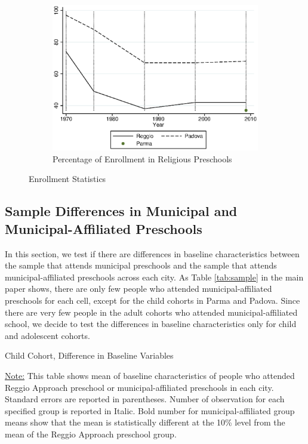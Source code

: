 \begin{figure}[H]
\begin{subfigure}[ht]{0.48\textwidth}
        \includegraphics[width=\textwidth]{../../output/image/enroll_per_priv_graph.eps}
        \caption{Percentage of Enrollment in Religious Preschools}
        \label{fig:large}
      \end{subfigure}
      \caption{Enrollment Statistics}  \label{fig:enrollment}
    \end{figure}    
    
    
\subsection{Sample Differences in Municipal and Municipal-Affiliated Preschools}

In this section, we test if there are differences in baseline characteristics between the sample that attends municipal preschools and the sample that attends municipal-affiliated preschools across each city. As Table \ref{tab:sample} in the main paper shows, there are only few people who attended municipal-affiliated preschools for each cell, except for the child cohorts in Parma and Padova. Since there are very few people in the adult cohorts who attended municipal-affiliated school, we decide to test the differences in baseline characteristics only for child and adolescent cohorts. 

\begin{table}[H] \caption{Child Cohort, Difference in Baseline Variables} \label{apptab:munivsaffi-child}
	\scalebox{0.8}{
	}
\footnotesize\raggedright{\underline{Note:} This table shows mean of baseline characteristics of people who attended Reggio Approach preschool or municipal-affiliated preschools in each city. Standard errors are reported in parentheses. Number of observation for each specified group is reported in Italic. Bold number for municipal-affiliated group means show that the mean is statistically different at the 10\% level from the mean of the Reggio Approach preschool group.}

\end{table}
    
